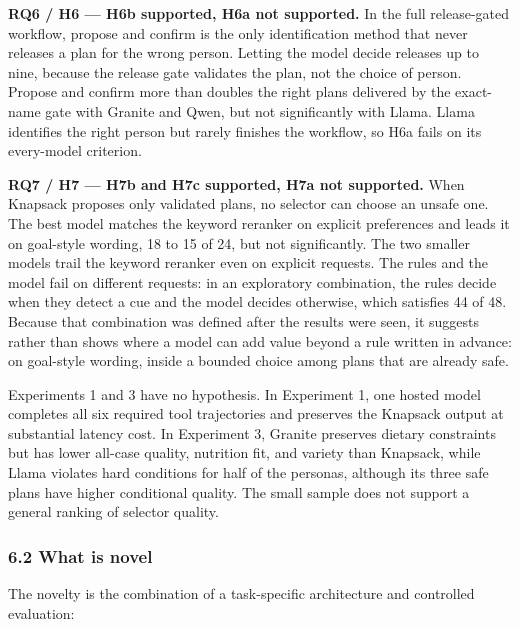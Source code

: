 \documentclass[
  10pt,
  letterpaper,
]{article}
\begin{document}
\textbf{RQ6 / H6 --- H6b supported, H6a not supported.} In the full
release-gated workflow, propose and confirm is the only identification
method that never releases a plan for the wrong person. Letting the
model decide releases up to nine, because the release gate validates the
plan, not the choice of person. Propose and confirm more than doubles
the right plans delivered by the exact-name gate with Granite and Qwen,
but not significantly with Llama. Llama identifies the right person but
rarely finishes the workflow, so H6a fails on its every-model criterion.

\textbf{RQ7 / H7 --- H7b and H7c supported, H7a not supported.} When
Knapsack proposes only validated plans, no selector can choose an unsafe
one. The best model matches the keyword reranker on explicit preferences
and leads it on goal-style wording, 18 to 15 of 24, but not
significantly. The two smaller models trail the keyword reranker even on
explicit requests. The rules and the model fail on different requests:
in an exploratory combination, the rules decide when they detect a cue
and the model decides otherwise, which satisfies 44 of 48. Because that
combination was defined after the results were seen, it suggests rather
than shows where a model can add value beyond a rule written in advance:
on goal-style wording, inside a bounded choice among plans that are
already safe.

Experiments 1 and 3 have no hypothesis. In Experiment 1, one hosted
model completes all six required tool trajectories and preserves the
Knapsack output at substantial latency cost. In Experiment 3, Granite
preserves dietary constraints but has lower all-case quality, nutrition
fit, and variety than Knapsack, while Llama violates hard conditions for
half of the personas, although its three safe plans have higher
conditional quality. The small sample does not support a general ranking
of selector quality.

\subsubsection{6.2 What is novel}\label{what-is-novel}

The novelty is the combination of a task-specific architecture and
controlled evaluation:
\end{document}
